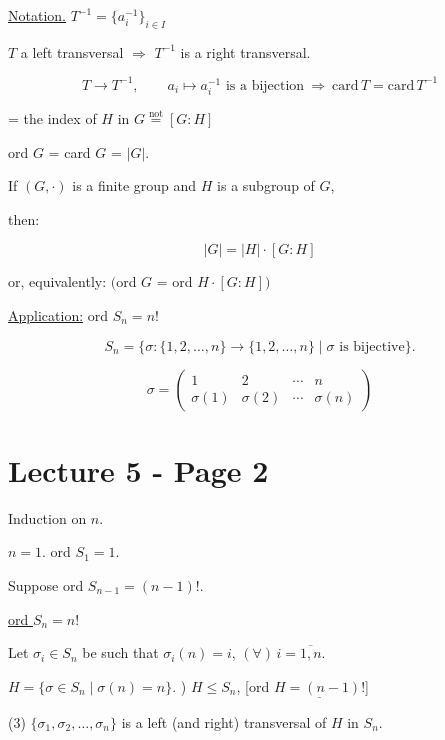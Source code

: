 \bigskip
\noindent\underline{Notation.} $T^{-1} = \{a_i^{-1}\}_{i\in I}$

\noindent $T$ a left transversal $\Rightarrow$ $T^{-1}$ is a right transversal.

\[
T \xrightarrow{\ } T^{-1}, \qquad a_i \mapsto a_i^{-1} \text{ is a bijection} \ \Rightarrow \ \text{card}\, T = \text{card}\, T^{-1}
\]

\noindent = the index of $H$ in $G \overset{\text{not}}{=} [G:H]$

\noindent ord $G$ = card $G$ = $|G|$.

\bigskip
\noindent{} \quad If $(G,\cdot)$ is a finite group and $H$ is a subgroup of $G$,

\noindent then:

\[
\boxed{|G| = |H|\cdot [G:H]}
\]

\noindent or, equivalently: \quad $\big($ord $G$ = ord $H\cdot [G:H]\big)$

\bigskip
\noindent\underline{Application:} ord $S_n = n!$

\[
S_n = \{\sigma : \{1,2,\ldots,n\}\to\{1,2,\ldots,n\} \mid \sigma \text{ is bijective}\}.
\]


\[
\sigma = \begin{pmatrix} 1 & 2 & \cdots & n \\ \sigma(1) & \sigma(2) & \cdots & \sigma(n) \end{pmatrix}
\]




\section*{Lecture 5 - Page 2}

\noindent Induction on $n$.

\bigskip
\noindent $n=1$. \quad ord $S_1=1$.

\bigskip
\noindent Suppose ord $S_{n-1}=(n-1)!$.

\noindent\underline{ord $S_n=n!$}

\bigskip
\noindent Let $\sigma_i\in S_n$ be such that $\sigma_i(n)=i$, $(\forall)\, i=\overline{1,n}$.

\bigskip
\noindent $H=\{\sigma\in S_n \mid \sigma(n)=n\}$. ) \underline{$H\leq S_n$}, [ord $\underline{H=(n-1)!}$]

\bigskip
\noindent (3) $\{\sigma_1,\sigma_2,\ldots,\sigma_n\}$ is a left (and right) transversal of $H$ in $S_n$.

